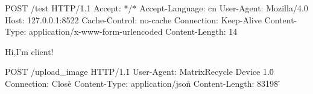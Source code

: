 POST /test HTTP/1.1
Accept: */*
Accept-Language: cn
User-Agent: Mozilla/4.0
Host: 127.0.0.1:8522
Cache-Control: no-cache
Connection: Keep-Alive
Content-Type: application/x-www-form-urlencoded
Content-Length: 14

Hi,I'm client!



POST /upload_image HTTP/1.1\r\n
User-Agent: MatrixRecycle Device 1.0\r\n
Connection: Close\r\n
Content-Type: application/json\r\n
Content-Length: 83198\r\n
\r\n